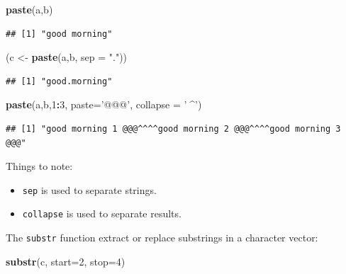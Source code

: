 \documentclass[]{book}
\newenvironment{Shaded}{\begin{snugshade}}{\end{snugshade}}
\newcommand{\DataTypeTok}[1]{\textcolor[rgb]{0.13,0.29,0.53}{#1}}
\newcommand{\DecValTok}[1]{\textcolor[rgb]{0.00,0.00,0.81}{#1}}
\newcommand{\KeywordTok}[1]{\textcolor[rgb]{0.13,0.29,0.53}{\textbf{#1}}}
\newcommand{\NormalTok}[1]{#1}
\newcommand{\OperatorTok}[1]{\textcolor[rgb]{0.81,0.36,0.00}{\textbf{#1}}}
\newcommand{\StringTok}[1]{\textcolor[rgb]{0.31,0.60,0.02}{#1}}
\providecommand{\tightlist}{%
  \setlength{\itemsep}{0pt}\setlength{\parskip}{0pt}}
\theoremstyle{definition}
\theoremstyle{definition}
\theoremstyle{definition}
\theoremstyle{remark}
\begin{document}
\begin{Shaded}
\begin{Highlighting}[]
\KeywordTok{paste}\NormalTok{(a,b)}
\end{Highlighting}
\end{Shaded}

\begin{verbatim}
## [1] "good morning"
\end{verbatim}

\begin{Shaded}
\begin{Highlighting}[]
\NormalTok{(c <-}\StringTok{ }\KeywordTok{paste}\NormalTok{(a,b, }\DataTypeTok{sep =} \StringTok{"."}\NormalTok{))}
\end{Highlighting}
\end{Shaded}

\begin{verbatim}
## [1] "good.morning"
\end{verbatim}

\begin{Shaded}
\begin{Highlighting}[]
\KeywordTok{paste}\NormalTok{(a,b,}\DecValTok{1}\OperatorTok{:}\DecValTok{3}\NormalTok{, }\DataTypeTok{paste=}\StringTok{'@@@'}\NormalTok{, }\DataTypeTok{collapse =} \StringTok{'^^^^'}\NormalTok{)}
\end{Highlighting}
\end{Shaded}

\begin{verbatim}
## [1] "good morning 1 @@@^^^^good morning 2 @@@^^^^good morning 3 @@@"
\end{verbatim}

Things to note:

\begin{itemize}
\tightlist
\item
  \texttt{sep} is used to separate strings.
\item
  \texttt{collapse} is used to separate results.
\end{itemize}

The \texttt{substr} function extract or replace substrings in a character vector:

\begin{Shaded}
\begin{Highlighting}[]
\KeywordTok{substr}\NormalTok{(c, }\DataTypeTok{start=}\DecValTok{2}\NormalTok{, }\DataTypeTok{stop=}\DecValTok{4}\NormalTok{)}
\end{Highlighting}
\end{Shaded}
\end{document}
